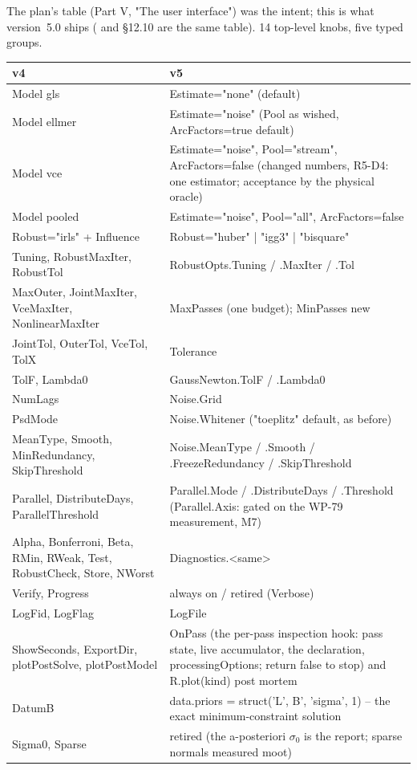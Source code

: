 The plan's table (Part V, "The user interface") was the intent; this is what
version~5.0 ships ( and 
\S12.10 are the same table). 14 top-level knobs, five typed groups.

\begin{longtable}{@{}P{56mm}P{98mm}@{}}
\toprule
v4 & v5\\
\midrule
Model gls & Estimate="none" (default)\\
Model ellmer & Estimate="noise" (Pool as wished, ArcFactors=true default)\\
Model vce & Estimate="noise", Pool="stream", ArcFactors=false (changed numbers, R5-D4: one estimator; acceptance by the physical oracle)\\
Model pooled & Estimate="noise", Pool="all", ArcFactors=false\\
Robust="irls" + Influence & Robust="huber" | "igg3" | "bisquare"\\
Tuning, RobustMaxIter, RobustTol & RobustOpts.Tuning / .MaxIter / .Tol\\
MaxOuter, JointMaxIter, VceMaxIter, NonlinearMaxIter & MaxPasses (one budget); MinPasses new\\
JointTol, OuterTol, VceTol, TolX & Tolerance\\
TolF, Lambda0 & GaussNewton.TolF / .Lambda0\\
NumLags & Noise.Grid\\
PsdMode & Noise.Whitener ("toeplitz" default, as before)\\
MeanType, Smooth, MinRedundancy, SkipThreshold & Noise.MeanType / .Smooth / .FreezeRedundancy / .SkipThreshold\\
Parallel, DistributeDays, ParallelThreshold & Parallel.Mode / .DistributeDays / .Threshold (Parallel.Axis: gated on the WP-79 measurement, M7)\\
Alpha, Bonferroni, Beta, RMin, RWeak, Test, RobustCheck, Store, NWorst & Diagnostics.<same>\\
Verify, Progress & always on / retired (Verbose)\\
LogFid, LogFlag & LogFile\\
ShowSeconds, ExportDir, plotPostSolve, plotPostModel & OnPass (the per-pass inspection hook: pass state, live accumulator, the declaration, processingOptions; return false to stop) and R.plot(kind) post mortem\\
DatumB & data.priors = struct('L', B', 'sigma', 1) -- the exact minimum-constraint solution\\
Sigma0, Sparse & retired (the a-posteriori $\sigma_0$ is the report; sparse normals measured moot)\\

\end{longtable}
